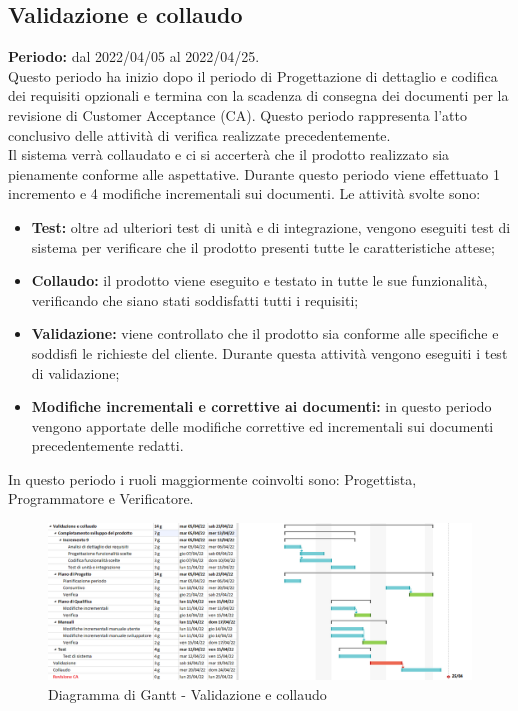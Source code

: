 
\subsection{Validazione e collaudo} \label{subsection:pianificazione_validazione}
  \textbf{Periodo:} dal 2022/04/05 al 2022/04/25.
  \bigskip
  \\Questo periodo ha inizio dopo il periodo di Progettazione di dettaglio e codifica dei requisiti opzionali e termina con la scadenza di consegna dei documenti per la revisione di Customer Acceptance (CA).
  Questo periodo rappresenta l'atto conclusivo delle attività di verifica realizzate precedentemente.
  \\Il sistema verrà collaudato e ci si accerterà che il prodotto realizzato
  sia pienamente conforme alle aspettative.
  Durante questo periodo viene effettuato 1 incremento e 4 modifiche incrementali sui documenti. 
  Le attività svolte sono:
  \begin{itemize}
    \item \textbf{Test:} oltre ad ulteriori test di unità e di integrazione, vengono eseguiti test di sistema per verificare che il prodotto presenti tutte le caratteristiche attese;
    \item \textbf{Collaudo:} il prodotto viene eseguito e testato in tutte le sue funzionalità, verificando che siano stati soddisfatti tutti i requisiti;
    \item \textbf{Validazione:} viene controllato che il prodotto sia conforme alle specifiche e soddisfi le richieste del cliente.
    Durante questa attività vengono eseguiti i test di validazione;
    \item \textbf{Modifiche incrementali e correttive ai documenti:} in questo periodo vengono apportate delle modifiche correttive ed incrementali sui documenti precedentemente redatti.
  \end{itemize}
  In questo periodo i ruoli maggiormente coinvolti sono: Progettista, Programmatore e Verificatore.
  \bigskip
  \begin{figure}[H]
    \centering
     \includegraphics[scale=0.54]{immagini/validazione_collaudo.png}
     \caption{Diagramma di Gantt - Validazione e collaudo}
   \end{figure}
   \pagebreak
